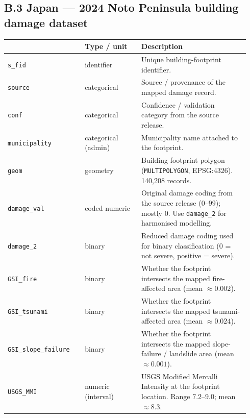 \documentclass[11pt,a4paper]{article}
\begin{document}
\subsection*{B.3 \quad Japan --- 2024 Noto Peninsula building damage dataset}

\begin{longtable}{
>{\scriptsize\ttfamily\RaggedRight\arraybackslash}p{0.30\linewidth}
p{0.22\linewidth}
p{0.42\linewidth}
}
\toprule
{\normalsize\normalfont\bfseries Raw variable} &
\textbf{Type / unit} &
\textbf{Description} \\
\midrule
\endhead
\texttt{s\_fid}                                & identifier              & Unique building-footprint identifier. \\
\texttt{source}                                & categorical             & Source / provenance of the mapped damage record. \\
\texttt{conf}                                  & categorical             & Confidence / validation category from the source release. \\
\texttt{municipality}                          & categorical (admin)     & Municipality name attached to the footprint. \\
\texttt{geom}                                  & geometry                & Building footprint polygon (\texttt{MULTIPOLYGON}, EPSG:4326). 140{,}208 records. \\
\texttt{damage\_val}                           & coded numeric           & Original damage coding from the source release ($0$--$99$); mostly $0$. Use \texttt{damage\_2} for harmonised modelling. \\
\texttt{damage\_2}                             & binary                  & Reduced damage coding used for binary classification ($0$ = not severe, positive = severe). \\
\texttt{GSI\_fire}                             & binary                  & Whether the footprint intersects the mapped fire-affected area (mean $\approx 0.002$). \\
\texttt{GSI\_tsunami}                          & binary                  & Whether the footprint intersects the mapped tsunami-affected area (mean $\approx 0.024$). \\
\texttt{GSI\_slope\_failure}                   & binary                  & Whether the footprint intersects the mapped slope-failure / landslide area (mean $\approx 0.001$). \\
\texttt{USGS\_MMI}                             & numeric (interval)      & USGS Modified Mercalli Intensity at the footprint location. Range $7.2$--$9.0$; mean $\approx 8.3$. \\
\bottomrule
\end{longtable}
\end{document}
